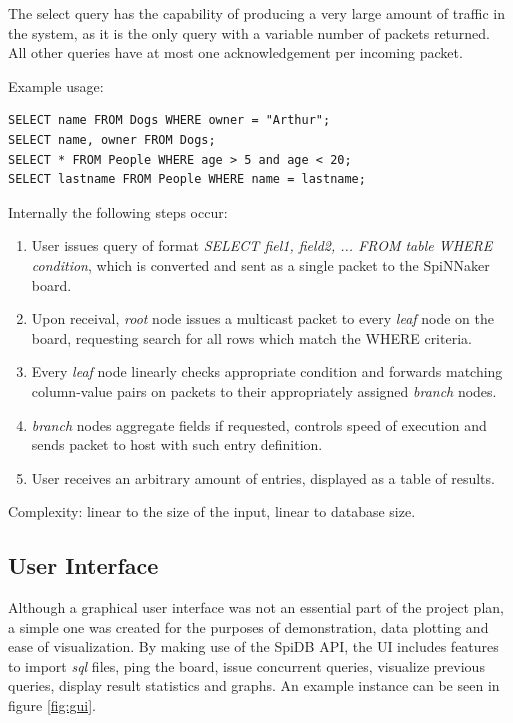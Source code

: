 The select query has the capability of producing a very large amount of traffic in the system, as it is the only query with a variable number of packets returned. All other queries have at most one acknowledgement per incoming packet. 

Example usage:
\begin{lstlisting}
SELECT name FROM Dogs WHERE owner = "Arthur";
SELECT name, owner FROM Dogs;
SELECT * FROM People WHERE age > 5 and age < 20;
SELECT lastname FROM People WHERE name = lastname;
\end{lstlisting}
   
Internally the following steps occur:
\begin{enumerate}
\item User issues query of format \textit{SELECT fiel1, field2, ... FROM table WHERE condition}, which is converted and sent as a single packet to the SpiNNaker board.
\item Upon receival, \textit{root} node issues a multicast packet to every \textit{leaf} node on the board, requesting search for all rows which match the WHERE criteria.
\item Every \textit{leaf} node linearly checks appropriate condition and forwards matching column-value pairs on packets to their appropriately assigned \textit{branch} nodes.
\item \textit{branch} nodes aggregate fields if requested, controls speed of execution and sends packet to host with such entry definition.
\item User receives an arbitrary amount of entries, displayed as a table of results.
\end{enumerate}

Complexity: linear to the size of the input, linear to database size.
 
\subsection{User Interface} 
Although a graphical user interface was not an essential part of the project plan, a simple one was created for the purposes of demonstration, data plotting and ease of visualization. By making use of the SpiDB API, the UI includes features to import \textit{sql} files, ping the board, issue concurrent queries, visualize previous queries, display result statistics and graphs. An example instance can be seen in figure \ref{fig:gui}.

